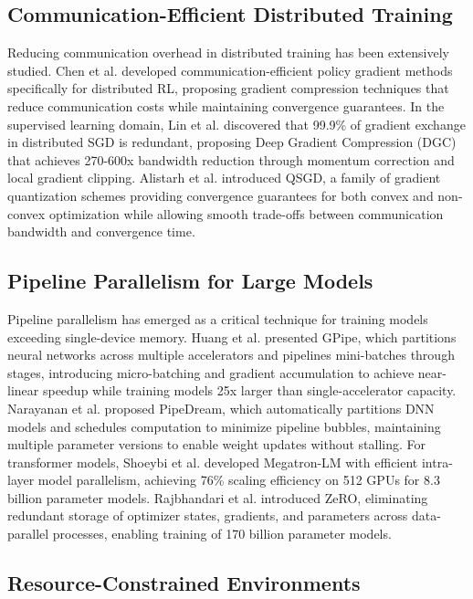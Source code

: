 \documentclass[conference]{IEEEtran}
\begin{document}
\subsection{Communication-Efficient Distributed Training}

Reducing communication overhead in distributed training has been extensively studied. Chen et al. \cite{chen2018} developed communication-efficient policy gradient methods specifically for distributed RL, proposing gradient compression techniques that reduce communication costs while maintaining convergence guarantees. In the supervised learning domain, Lin et al. \cite{dgc2018} discovered that 99.9\% of gradient exchange in distributed SGD is redundant, proposing Deep Gradient Compression (DGC) that achieves 270-600x bandwidth reduction through momentum correction and local gradient clipping. Alistarh et al. \cite{qsgd2017} introduced QSGD, a family of gradient quantization schemes providing convergence guarantees for both convex and non-convex optimization while allowing smooth trade-offs between communication bandwidth and convergence time.

\subsection{Pipeline Parallelism for Large Models}

Pipeline parallelism has emerged as a critical technique for training models exceeding single-device memory. Huang et al. \cite{gpipe2019} presented GPipe, which partitions neural networks across multiple accelerators and pipelines mini-batches through stages, introducing micro-batching and gradient accumulation to achieve near-linear speedup while training models 25x larger than single-accelerator capacity. Narayanan et al. \cite{pipedream2019} proposed PipeDream, which automatically partitions DNN models and schedules computation to minimize pipeline bubbles, maintaining multiple parameter versions to enable weight updates without stalling. For transformer models, Shoeybi et al. \cite{megatron2019} developed Megatron-LM with efficient intra-layer model parallelism, achieving 76\% scaling efficiency on 512 GPUs for 8.3 billion parameter models. Rajbhandari et al. \cite{zero2020} introduced ZeRO, eliminating redundant storage of optimizer states, gradients, and parameters across data-parallel processes, enabling training of 170 billion parameter models.

\subsection{Resource-Constrained Environments}
\end{document}
